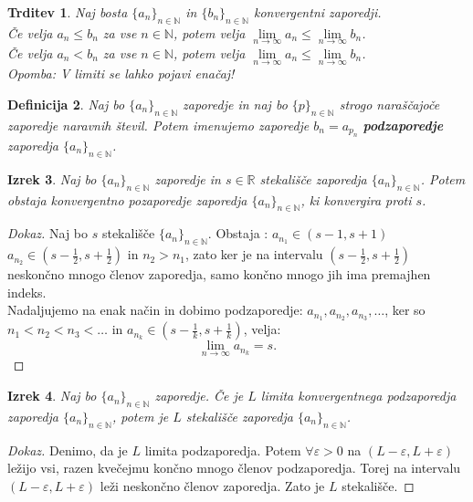 \documentclass[11pt]{article}
\newtheorem{Izrek}{{\sc Izrek}}[section]
\newtheorem{Trditev}[Izrek]{{\sc Trditev}}
\newtheorem{Definicija}[Izrek]{{\sc Definicija}}
\newenvironment{dokaz}[1][{\sc Dokaz}]{\begin{proof}[#1]\renewcommand*{\qedsymbol}{\(\blacksquare\)}}{\end{proof}}
\begin{document}
\begin{Trditev}
	Naj bosta  $\{a_n\}_{n\in \mathbb{N}}$ in $\{b_n\}_{n\in \mathbb{N}}$ konvergentni zaporedji.
	\\
	\indent Če velja $a_n \le b_n$ za vse $n\in\mathbb{N}$, potem velja $\lim\limits_{n \to \infty}{a_n} \le \lim\limits_{n \to \infty}{b_n}$.
	\\
	\indent Če velja $a_n < b_n$ za vse $n\in\mathbb{N}$, potem velja $\lim\limits_{n \to \infty}{a_n} \le \lim\limits_{n \to \infty}{b_n}$.
	\\
	\indent Opomba: V limiti se lahko pojavi enačaj!
\end{Trditev}
\begin{Definicija}
	Naj bo $\{a_n\}_{n\in \mathbb{N}}$ zaporedje in naj bo $\{p\}_{n\in \mathbb{N}}$ strogo naraščajoče zaporedje naravnih števil. Potem imenujemo zaporedje $b_n = a_{p_n}$ \textbf{podzaporedje} zaporedja $\{a_n\}_{n\in \mathbb{N}}$.
\end{Definicija}
\begin{Izrek}
	Naj bo $\{a_n\}_{n\in \mathbb{N}}$ zaporedje in $s\in \mathbb{R}$ stekališče zaporedja $\{a_n\}_{n\in \mathbb{N}}$. Potem obstaja konvergentno pozaporedje zaporedja $\{a_n\}_{n\in \mathbb{N}}$, ki konvergira proti $s$.
\end{Izrek}
\begin{dokaz}
	Naj bo $s$ stekališče $\{a_n\}_{n\in \mathbb{N}}$.
	Obstaja : $a_{n_1} \in (s -1, s + 1)$
	\\
	$a_{n_2}\in (s - \frac{1}{2}, s +  \frac{1}{2})$ in $n_2 > n_1$, zato ker je na intervalu $(s - \frac{1}{2}, s +  \frac{1}{2})$ neskončno mnogo členov zaporedja, samo končno mnogo jih ima premajhen indeks.
	\\
	Nadaljujemo na enak način in dobimo podzaporedje:
	$a_{n_1}, a_{n_2}, a_{n_3},\dots$, ker so \newline $n_1 < n_2 < n_3 < \dots$ in $ a_{n_k} \in (s - \frac{1}{k}, s +  \frac{1}{k})$, velja:
	$$\lim\limits_{n \to \infty}{a_{n_k}} = s.$$
\end{dokaz}
\begin{Izrek}
	Naj bo  $\{a_n\}_{n\in \mathbb{N}}$ zaporedje. Če je $L$ limita konvergentnega podzaporedja zaporedja  $\{a_n\}_{n\in \mathbb{N}}$, potem je $L$ stekališče zaporedja  $\{a_n\}_{n\in \mathbb{N}}$.
\end{Izrek}
\begin{dokaz}
	Denimo, da je $L$ limita podzaporedja. Potem $\forall \varepsilon > 0$ na $(L - \varepsilon, L + \varepsilon)$ ležijo vsi, razen kvečejmu končno mnogo členov podzaporedja. Torej na intervalu $(L - \varepsilon, L + \varepsilon)$ leži neskončno členov zaporedja. Zato je $L$ stekališče.
\end{dokaz}
\end{document}
